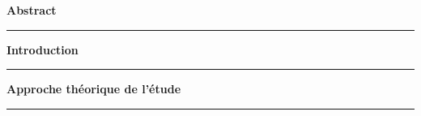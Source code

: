 \documentclass[12pt]{article}
\begin{document}
	\newpage
	
		\begin{flushright} %
		\textbf{\Large Abstract}
		
		\rule{0.8\linewidth}{0.4pt} %
		\vspace{0.5cm}
		
	\end{flushright}
	
	\newpage
	
	
	\begin{flushright} %
		\textbf{\Large Introduction}
		
		
		\rule{0.8\linewidth}{0.4pt} %
		\vspace{0.5cm}
		
	\end{flushright}
	
	\newpage
	
		\begin{flushright} %
		\textbf{\Large Approche théorique de l'étude}
		
		
		\rule{0.8\linewidth}{0.4pt} %
		\vspace{0.5cm}
		
	\end{flushright}
	
\end{document}
